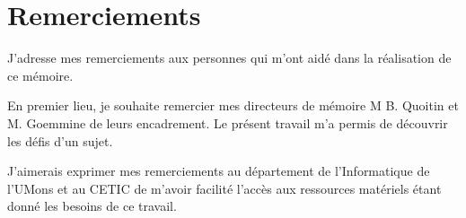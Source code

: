 \chapter*{Remerciements}

J'adresse mes remerciements aux personnes qui m'ont aidé dans la réalisation de ce mémoire.

En premier lieu, je souhaite remercier mes directeurs de mémoire M B. Quoitin et M. Goemmine de leurs 
encadrement.   Le présent travail m'a permis de découvrir les défis d'un sujet.

J'aimerais exprimer mes remerciements au département de l'Informatique de l'UMons  et au CETIC  de m'avoir facilité l'accès aux ressources matériels étant donné les besoins de ce travail. 



